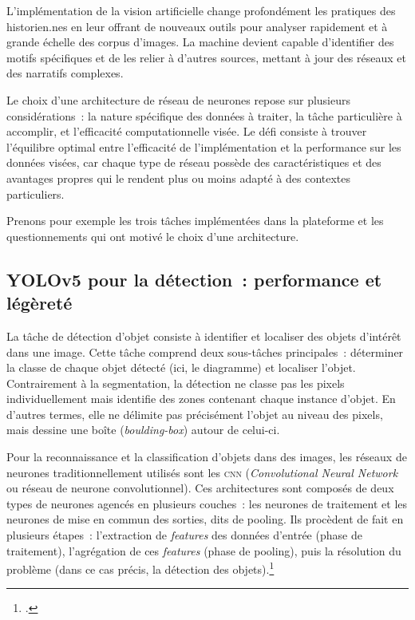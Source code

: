 L'implémentation de la vision artificielle change profondément les
pratiques des historien.nes en leur offrant de nouveaux outils pour
analyser rapidement et à grande échelle des corpus d'images. La machine
devient capable d'identifier des motifs spécifiques et de les relier à
d'autres sources, mettant à jour des réseaux et des narratifs complexes.

Le choix d'une architecture de réseau de neurones repose sur plusieurs
considérations~: la nature spécifique des données à traiter, la tâche
particulière à accomplir, et l'efficacité computationnelle visée. Le
défi consiste à trouver l'équilibre optimal entre l'efficacité de
l'implémentation et la performance sur les données visées, car chaque
type de réseau possède des caractéristiques et des avantages propres qui
le rendent plus ou moins adapté à des contextes particuliers.

Prenons pour exemple les trois tâches implémentées dans la plateforme
\eida et les questionnements qui ont motivé le choix d'une architecture.

\hypertarget{detection}{%
\subsection{YOLOv5 pour la détection~: performance et
légèreté}\label{detection}}

La tâche de détection d'objet consiste à identifier et localiser des
objets d'intérêt dans une image. Cette tâche comprend deux sous-tâches
principales~: déterminer la classe de chaque objet détecté (ici, le
diagramme) et localiser l'objet. Contrairement à la segmentation, la
détection ne classe pas les pixels individuellement mais identifie des
zones contenant chaque instance d'objet. En d'autres termes, elle ne
délimite pas précisément l'objet au niveau des pixels, mais dessine une
boîte (\emph{boulding-box}) autour de celui-ci.

Pour la reconnaissance et la classification d'objets dans des images,
les réseaux de neurones traditionnellement utilisés sont les \textsc{cnn}
(\emph{Convolutional Neural Network} ou réseau de neurone
convolutionnel). Ces architectures sont composés de deux types de
neurones agencés en plusieurs couches~: les neurones de traitement et
les neurones de mise en commun des sorties, dits de pooling. Ils
procèdent de fait en plusieurs étapes~: l'extraction de \emph{features}
des données d'entrée (phase de traitement), l'agrégation de ces
\emph{features} (phase de pooling), puis la résolution du problème (dans
ce cas précis, la détection des objets).\footcite[p.680-681]{indolia_conceptual_2018}

